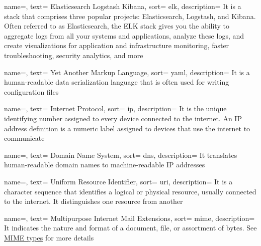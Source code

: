 {
  name=,
  text= Elasticsearch Logstash Kibana,
  sort= elk,
  description= {It is a stack that comprises three popular projects: Elasticsearch, Logstash, and Kibana. Often referred to as Elasticsearch, the ELK stack gives you the ability to aggregate logs from all your systems and applications, analyze these logs, and create visualizations for application and infrastructure monitoring, faster troubleshooting, security analytics, and more}
}

{
  name=,
  text= Yet Another Markup Language,
  sort= yaml,
  description= {It is a human-readable data serialization language that is often used for writing configuration files}
}

{
  name=,
  text= Internet Protocol,
  sort= ip,
  description= {It is the unique identifying number assigned to every device connected to the internet. An IP address definition is a numeric label assigned to devices that use the internet to communicate}
}

{
  name=,
  text= Domain Name System,
  sort= dns,
  description= {It translates human-readable domain names to machine-readable IP addresses}
}

{
  name=,
  text= Uniform Resource Identifier,
  sort= uri,
  description= {It is a character sequence that identifies a logical or physical resource, usually connected to the internet. It distinguishes one resource from another}
}

{
  name=,
  text= Multipurpose Internet Mail Extensions,
  sort= mime,
  description= {It indicates the nature and format of a document, file, or assortment of bytes. See \href{https://developer.mozilla.org/en-US/docs/Web/HTTP/Basics_of_HTTP/MIME_types}{MIME types} for more details}
}


